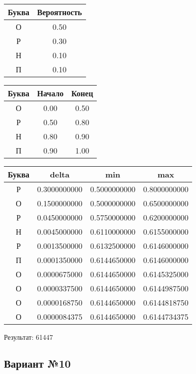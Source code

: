 \documentclass[a4paper, 12pt]{article}
\begin{document}
\begin{center}
 \begin{tabular}{ |c|c| } 
  \hline
     Буква & Вероятность \\ \hline
О & 0.50\\\hline
Р & 0.30\\\hline
Н & 0.10\\\hline
П & 0.10
\\ \hline \end{tabular}
\end{center}
\begin{center}
 \begin{tabular}{ |c|c|c| } 
  \hline
     Буква & Начало & Конец \\ \hline
О & 0.00 & 0.50\\\hline
Р & 0.50 & 0.80\\\hline
Н & 0.80 & 0.90\\\hline
П & 0.90 & 1.00
\\ \hline \end{tabular}
\end{center}
\begin{center}
 \begin{tabular}{ |c|c|c|c| } 
  \hline
     Буква & delta & min & max \\ \hline
Р & 0.3000000000 & 0.5000000000 & 0.8000000000\\\hline
О & 0.1500000000 & 0.5000000000 & 0.6500000000\\\hline
Р & 0.0450000000 & 0.5750000000 & 0.6200000000\\\hline
Н & 0.0045000000 & 0.6110000000 & 0.6155000000\\\hline
Р & 0.0013500000 & 0.6132500000 & 0.6146000000\\\hline
П & 0.0001350000 & 0.6144650000 & 0.6146000000\\\hline
О & 0.0000675000 & 0.6144650000 & 0.6145325000\\\hline
О & 0.0000337500 & 0.6144650000 & 0.6144987500\\\hline
О & 0.0000168750 & 0.6144650000 & 0.6144818750\\\hline
О & 0.0000084375 & 0.6144650000 & 0.6144734375
\\ \hline \end{tabular}
\end{center}
Результат: 61447
\pagebreak
\subsection{Вариант №10}
\end{document}
